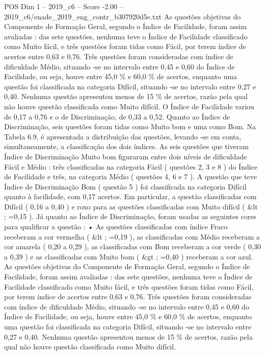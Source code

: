 \begin{textsample}{POS Dim 1 – 2019\_c6 – Score -2.00 – 2019\_c6/enade\_2019\_eng\_contr\_b307920d5e.txt}
As questões objetivas do Componente de Formação Geral, segundo o Índice de Facilidade, foram assim avaliadas : das sete questões, nenhuma teve o Índice de Facilidade classificado como Muito fácil, e três questões foram tidas como Fácil, por terem índice de acertos entre 0,63 e 0,76.
Três questões foram consideradas com índice de dificuldade Médio, situando -se no intervalo entre 0,45 e 0,60 do Índice de Facilidade, ou seja, houve entre 45,0 \% e 60,0 \% de acertos, enquanto uma questão foi classificada na categoria Difícil, situando -se no intervalo entre 0,27 e 0,40.
Nenhuma questão apresentou menos de 15 \% de acertos, razão pela qual não houve questão classificada como Muito difícil.
O Índice de Facilidade variou de 0,17 a 0,76 e o de Discriminação, de 0,33 a 0,52.
Quanto ao Índice de Discriminação, seis questões foram tidas como Muito bom e uma como Bom.
Na Tabela 6.9, é apresentada a distribuição das questões, levando -se em conta, simultaneamente, a classificação dos dois índices.
As seis questões que tiveram Índice de Discriminação Muito bom figuraram entre dois níveis de dificuldade Fácil e Médio : três classificadas na categoria Fácil ( questões 2, 3 e 8 ) do Índice de Facilidade e três, na categoria Médio ( questões 4, 6 e 7 ).
A questão que teve Índice de Discriminação Bom ( questão 5 ) foi classificada na categoria Difícil quanto à facilidade, com 0,17 acertos.
Em particular, a questão classificadas com Difícil ( 0,16 a 0,40 ) e roxo para as questões classificadas com Muito difícil ( \&lt ; =0,15 ).
Já quanto ao Índice de Discriminação, foram usadas as seguintes cores para qualificar a questão : • As questões classificadas com índice Fraco receberam a cor vermelha ( \&lt ; =0,19 ), as classificadas com Médio receberam a cor amarela ( 0,20 a 0,29 ), as classificadas com Bom receberam a cor verde ( 0,30 a 0,39 ) e as classificadas com Muito bom ( \&gt ; =0,40 ) receberam a cor azul.
As questões objetivas do Componente de Formação Geral, segundo o Índice de Facilidade, foram assim avaliadas : das sete questões, nenhuma teve o Índice de Facilidade classificado como Muito fácil, e três questões foram tidas como Fácil, por terem índice de acertos entre 0,63 e 0,76.
Três questões foram consideradas com índice de dificuldade Médio, situando -se no intervalo entre 0,45 e 0,60 do Índice de Facilidade, ou seja, houve entre 45,0 \% e 60,0 \% de acertos, enquanto uma questão foi classificada na categoria Difícil, situando -se no intervalo entre 0,27 e 0,40.
Nenhuma questão apresentou menos de 15 \% de acertos, razão pela qual não houve questão classificada como Muito difícil.

\end{textsample}
